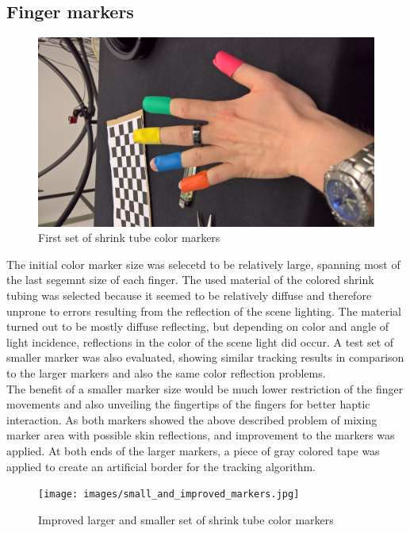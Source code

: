 \subsection{Finger markers}
\begin{figure} 
\centering
\includegraphics[width=\textwidth/2,angle=-90]{images/color_markers_hand.jpg}
\caption{First set of shrink tube color markers }
\label{img:first_set_color_markers}
\end{figure}
The initial color marker size was selecetd to be relatively large, spanning most of the last segemnt size of each finger.
The used material of the colored shrink tubing was selected because it seemed to be relatively diffuse and therefore unprone to errors resulting from the reflection of the scene lighting. The material turned out to be mostly diffuse reflecting, but depending on color and angle of light incidence, reflections in the color of the scene light did occur.
A test set of smaller marker was also evaluated, showing similar tracking results in comparison to the larger markers and also the same color reflection problems.\\The benefit of a smaller marker size would be much lower restriction of the finger movements and also unveiling the fingertips of the fingers for better haptic interaction.
As both markers showed the above described problem of mixing marker area with possible skin reflections, and improvement to the markers was applied. At both ends of the larger markers, a piece of gray colored tape was applied to create an artificial border for the tracking algorithm.
\begin{figure}[H]
\centering
\texttt{[image: images/small\_and\_improved\_markers.jpg]}
\caption{Improved larger and smaller set of shrink tube color markers }
\label{img:second_color_markers}
\end{figure}
